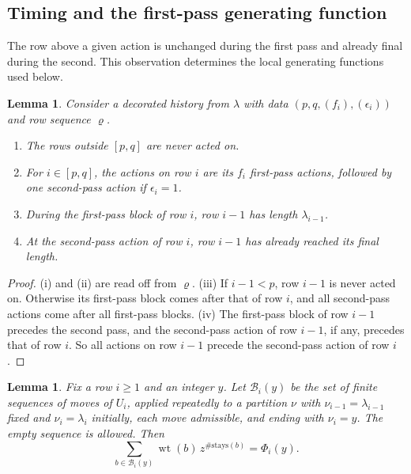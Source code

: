 \documentclass[11pt]{amsart}
\numberwithin{equation}{section}
\newtheorem{lemma}[theorem]{Lemma}
\theoremstyle{definition}
\theoremstyle{remark}
\newcommand{\wt}{\operatorname{wt}}
\newcommand{\cB}{\mathcal B}
\begin{document}
\subsection{Timing and the first-pass generating function}
The row above a given action is unchanged during the first pass and
already final during the second. This observation determines the local
generating functions used below.

\begin{lemma}\label{lem:timing}
Consider a decorated history from $\lambda$ with data
$(p,q,(f_i),(\epsilon_i))$ and row sequence $\varrho$.
\begin{enumerate}[label=\textup{(\roman*)}]
\item The rows outside $[p,q]$ are never acted on.
\item For $i\in[p,q]$, the actions on row $i$ are its $f_i$ first-pass
actions, followed by one second-pass action if $\epsilon_i=1$.
\item During the first-pass block of row $i$, row $i-1$ has length
$\lambda_{i-1}$.
\item At the second-pass action of row $i$, row $i-1$ has already reached
its final length.
\end{enumerate}
\end{lemma}

\begin{proof}
(i) and (ii) are read off from $\varrho$. (iii) If $i-1<p$, row $i-1$ is
never acted on. Otherwise its first-pass block comes after that of row $i$,
and all second-pass actions come after all first-pass blocks. (iv) The
first-pass block of row $i-1$ precedes the second pass, and the
second-pass action of row $i-1$, if any, precedes that of row $i$. So all
actions on row $i-1$ precede the second-pass action of row $i$.
\end{proof}

\begin{lemma}\label{lem:first-pass}
Fix a row $i\geq1$ and an integer $y$. Let $\cB_i(y)$ be the set of finite
sequences of moves of $U_i$, applied repeatedly to a partition $\nu$ with
$\nu_{i-1}=\lambda_{i-1}$ fixed and $\nu_i=\lambda_i$ initially, each move
admissible, and ending with $\nu_i=y$. The empty sequence is allowed.
Then
\[
 \sum_{b\in\cB_i(y)}\wt(b)\,z^{\#\mathrm{stays}(b)}=\Phi_i(y).
\]
\end{lemma}
\end{document}
